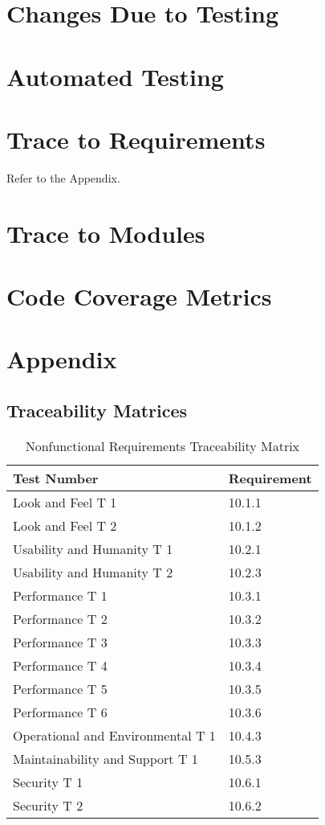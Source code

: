 \documentclass[12pt, titlepage]{article}
\begin{document}
\section{Changes Due to Testing}

\section{Automated Testing}
		
\section{Trace to Requirements}
Refer to the Appendix.
		
\section{Trace to Modules}		

\section{Code Coverage Metrics}

\newpage
\section*{Appendix}
\subsection*{Traceability Matrices}
\begin{table}[H]
	\caption{Nonfunctional Requirements Traceability Matrix} \label{TraceMatrix2}
	\begin{tabular}{ll}
		\toprule
		\textbf{Test Number} & \textbf{Requirement} \\
		\midrule
		Look and Feel T 1 & 10.1.1\\
		Look and Feel T 2 & 10.1.2\\
		\midrule
		Usability and Humanity T 1 & 10.2.1\\
		Usability and Humanity T 2 & 10.2.3\\
		\midrule
		Performance T 1 & 10.3.1\\
		Performance T 2 & 10.3.2\\
		Performance T 3 & 10.3.3\\
		Performance T 4 & 10.3.4\\
		Performance T 5 & 10.3.5\\
		Performance T 6 & 10.3.6\\
		\midrule
		Operational and Environmental T 1 & 10.4.3\\
		\midrule
		Maintainability and Support T 1 & 10.5.3\\
		\midrule
		Security T 1 & 10.6.1\\
		Security T 2 & 10.6.2\\
		\bottomrule
	\end{tabular}
\end{table}
\end{document}
